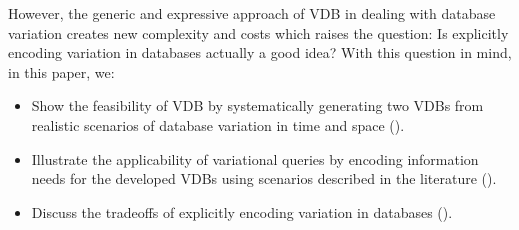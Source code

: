 However, the generic and expressive approach of VDB in dealing with database
variation creates new complexity and costs which raises the question: Is
explicitly encoding variation in databases actually a good idea?
%
With this question in mind, in this paper, we:
%
\begin{itemize}
%
\item Show the feasibility of VDB by systematically generating two VDBs from
realistic scenarios of database variation in time and space ().
%
\item Illustrate the applicability of variational queries by encoding
information needs for the developed VDBs using scenarios described in the
literature ().
%
\item Discuss the tradeoffs of explicitly encoding variation in databases
().
%
\end{itemize}





%


